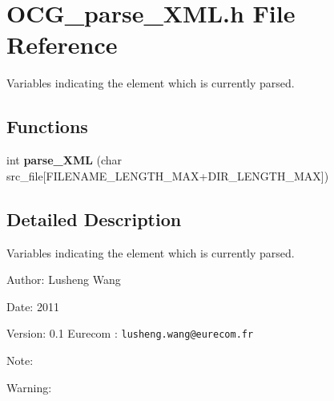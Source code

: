 \section{OCG\_\-parse\_\-XML.h File Reference}
\label{OCG__parse__XML_8h}
Variables indicating the element which is currently parsed.  


\subsection*{Functions}
\begin{CompactItemize}
\item 
int {\bf parse\_\-XML} (char src\_\-file[FILENAME\_\-LENGTH\_\-MAX+DIR\_\-LENGTH\_\-MAX])
\end{CompactItemize}


\subsection{Detailed Description}
Variables indicating the element which is currently parsed. 

\begin{Desc}
\item[Author:]Lusheng Wang \end{Desc}
\begin{Desc}
\item[Date:]2011 \end{Desc}
\begin{Desc}
\item[Version:]0.1  Eurecom : {\tt lusheng.wang@eurecom.fr} \end{Desc}
\begin{Desc}
\item[Note:]\end{Desc}
\begin{Desc}
\item[Warning:]\end{Desc}
